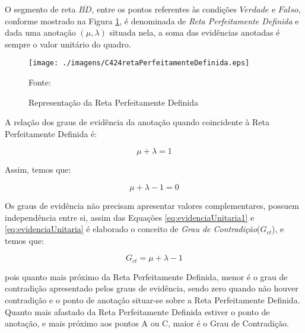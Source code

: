 O segmento de reta $\overline{BD}$, entre os pontos referentes às condições $Verdade$ e $Falso$, conforme mostrado na Figura \ref{fig:retaPerfeitamenteDefinida}, é denominada de \emph{Reta Perfeitamente Definida} e dada uma anotação $(\mu, \lambda )$ situada nela, a soma das evidências anotadas é sempre o valor unitário do quadro. 

\begin{figure}[!htb]
\caption{Representação da Reta Perfeitamente Definida}
\center\texttt{[image: ./imagens/C424retaPerfeitamenteDefinida.eps]}
\label{fig:retaPerfeitamenteDefinida}

{\small Fonte: \cite{JoaoInacio}}
\end{figure}

A relação dos graus de evidência da anotação quando coincidente à Reta Perfeitamente Definida é: 

\begin{center}
\begin{equation}
\mu + \lambda = 1
\label{eq:evidenciaUnitaria1}
\end{equation}
\end{center}

Assim, temos que:

\begin{center}
\begin{equation}
\mu + \lambda - 1 = 0
\label{eq:evidenciaUnitaria}
\end{equation}
\end{center}


Os graus de evidência não precisam apresentar valores complementares, possuem independência entre si, assim das Equações  
\ref{eq:evidenciaUnitaria1} e 
\ref{eq:evidenciaUnitaria} 
é elaborado o conceito de 
\emph{Grau de Contradição}($G_{ct}$), 
e temos que: 

\begin{center}
\begin{equation}
G _{ct} = \mu + \lambda - 1
\label{eq:grauContradicao}
\end{equation}
\end{center}

pois quanto mais próximo da Reta Perfeitamente Definida, menor é o grau de contradição apresentado pelos graus de evidência, sendo zero quando não houver contradição e o ponto de anotação situar-se sobre a Reta Perfeitamente Definida. 
Quanto mais afastado da Reta Perfeitamente Definida estiver o ponto de anotação, e mais próximo aos pontos A ou C, maior é o Grau de Contradição. 

